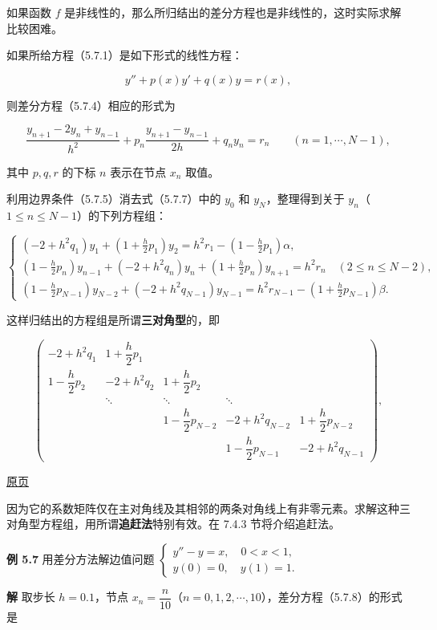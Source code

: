 \documentclass[
  10pt,
  fontset=fandol]{ctexart}
\begin{document}
如果函数 \(f\) 是非线性的，那么所归结出的差分方程也是非线性的，这时实际求解比较困难。

如果所给方程（5.7.1）是如下形式的线性方程：

\[
y''+p(x)y'+q(x)y=r(x),
\tag{5.7.6}
\]

则差分方程（5.7.4）相应的形式为

\[
\frac{y_{n+1}-2y_n+y_{n-1}}{h^2}+p_n\frac{y_{n+1}-y_{n-1}}{2h}+q_ny_n=r_n\qquad(n=1,\cdots,N-1),
\tag{5.7.7}
\]

其中 \(p,q,r\) 的下标 \(n\) 表示在节点 \(x_n\) 取值。

利用边界条件（5.7.5）消去式（5.7.7）中的 \(y_0\) 和 \(y_N\)，整理得到关于 \(y_n\)（\(1\le n\le N-1\)）的下列方程组：

\[
\begin{cases}
\displaystyle(-2+h^2q_1)y_1+\left(1+\frac h2p_1\right)y_2=h^2r_1-\left(1-\frac h2p_1\right)\alpha,\\[6pt]
\displaystyle\left(1-\frac h2p_n\right)y_{n-1}+(-2+h^2q_n)y_n+\left(1+\frac h2p_n\right)y_{n+1}=h^2r_n\quad(2\le n\le N-2),\\[6pt]
\displaystyle\left(1-\frac h2p_{N-1}\right)y_{N-2}+(-2+h^2q_{N-1})y_{N-1}=h^2r_{N-1}-\left(1+\frac h2p_{N-1}\right)\beta.
\end{cases}
\tag{5.7.8}
\]

这样归结出的方程组是所谓\textbf{三对角型}的，即

\[
\begin{pmatrix}
-2+h^2q_1 & 1+\dfrac h2p_1 & & & \\
1-\dfrac h2p_2 & -2+h^2q_2 & 1+\dfrac h2p_2 & & \\
& \ddots & \ddots & \ddots & \\
& & 1-\dfrac h2p_{N-2} & -2+h^2q_{N-2} & 1+\dfrac h2p_{N-2} \\
& & & 1-\dfrac h2p_{N-1} & -2+h^2q_{N-1}
\end{pmatrix},
\]

\href{../../source-images/pdf-150.jpeg}{原页}

因为它的系数矩阵仅在主对角线及其相邻的两条对角线上有非零元素。求解这种三对角型方程组，用所谓\textbf{追赶法}特别有效。在 7.4.3 节将介绍追赶法。

\textbf{例 5.7} 用差分方法解边值问题 \(\begin{cases}y''-y=x,\quad0<x<1,\\y(0)=0,\quad y(1)=1.\end{cases}\)

\textbf{解} 取步长 \(h=0.1\)，节点 \(x_n=\dfrac n{10}\)（\(n=0,1,2,\cdots,10\)），差分方程（5.7.8）的形式是
\end{document}
